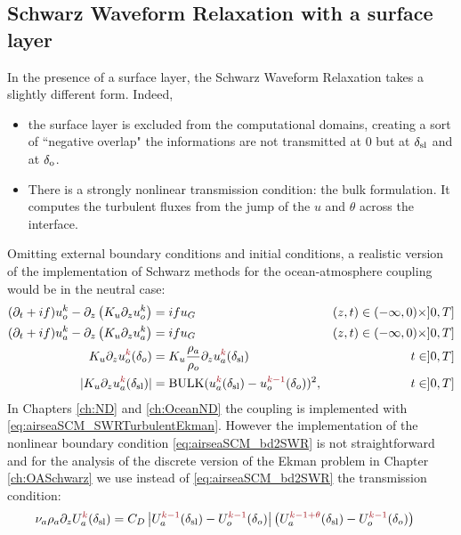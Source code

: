 \subsection{Schwarz Waveform Relaxation with a surface layer}
In the presence of a surface layer, the Schwarz Waveform Relaxation
takes a slightly different form.
Indeed, 
\begin{itemize}
\item the surface layer is excluded from the computational domains,
creating a sort of ``negative overlap" the informations are
not transmitted at 0 but at $\delta_{\rm sl}$ and at $\delta_{\rm o}$.
\item There is a strongly nonlinear transmission condition: the bulk
formulation. It computes the turbulent fluxes from the jump of
the $u$ and $\theta$ across the interface.
\end{itemize}
\par
Omitting external boundary conditions and initial conditions,
a realistic version of the implementation of Schwarz methods for
the ocean-atmosphere coupling would be in the neutral case:
\begin{subequations}
\begin{align}
(\partial_t+if) u_o^k - \partial_z \left(K_u \partial_z u_o^k\right)
	&= if u_G  & (z,t) \in (-\infty,0) \times ]0,T] \label{eq:airseaSCM_dr1} \\
(\partial_t+if) u_a^k - \partial_z \left(K_u \partial_z u_a^k\right)
	&= if u_G  & (z,t) \in (-\infty,0) \times ]0,T] \label{eq:airseaSCM_dr2} \\
	K_u \partial_z u_o^{\emphase{k}}(\delta_o) &=
	K_u \frac{\rho_a}{\rho_o} \partial_z u_a^{\emphase{k}}(\delta_{\rm sl})
	& t \in ]0,T] \label{eq:airseaSCM_bd1} \\
	|K_u \partial_z u_a^{\emphase{k}}(\delta_{\rm sl})|
	&= {\rm BULK}(u_a^{\emphase{k}}(\delta_{\rm sl})
	-u_o^{\emphase{k-1}}(\delta_o))^2,
	& t \in ]0,T]\label{eq:airseaSCM_bd2SWR}
\end{align}
\label{eq:airseaSCM_SWRTurbulentEkman}
\end{subequations}
In Chapters \ref{ch:ND} and \ref{ch:OceanND} the coupling is
implemented with \eqref{eq:airseaSCM_SWRTurbulentEkman}.
However the implementation of the nonlinear boundary condition
\eqref{eq:airseaSCM_bd2SWR} is not straightforward and for the
analysis of the discrete version of the Ekman problem in Chapter
\ref{ch:OASchwarz} we use instead of \eqref{eq:airseaSCM_bd2SWR}
the transmission condition:
\begin{equation}
	\label{eq:airseaSCM_simplifiedBdCondForOASchwarz}
	\begin{aligned}
		\nu_a \rho_a \partial_z U_a^{\emphase{k}}(\delta_{\rm sl})
		&= C_D \left|U_a^{\emphase{{k-1}}}(\delta_{\rm sl})
		-U_o^{\emphase{k-1}}(\delta_o)\right|\left(U_a^{\emphase{{k-1+\theta}}}
		(\delta_{\rm sl}) -U_o^{\emphase{k-1}}(\delta_o)\right)
	\end{aligned}
\end{equation}
